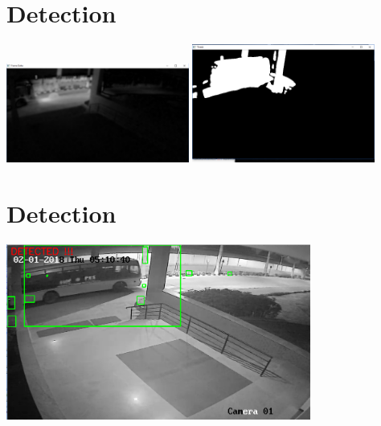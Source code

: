 \documentclass{beamer}
\begin{document}
\section{Detection}
\begin{frame}{}
  \begin{center}
    \includegraphics[width=6cm,keepaspectratio]{FrameDelta.png}
    \newline
    \includegraphics[width=6cm,keepaspectratio]{Grayscale.png}
  \end{center}
\end{frame}


\section{Detection}
\begin{frame}{}
  \begin{center}
    \includegraphics[width=10cm,keepaspectratio]{detection.png}
  \end{center}
\end{frame}
\end{document}
